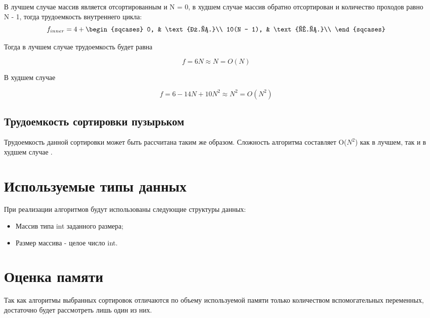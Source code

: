В лучшем случае массив является отсортированным и N = 0, в худшем случае массив обратно отсортирован и количество проходов равно N - 1, тогда трудоемкость внутреннего цикла:
\begin{equation}
	f_{inner} = 4 + \begin{sqcases}
						0, & \text{л.с.}\\
						10(N - 1), & \text{х.с.}\\
					\end{sqcases}
\end{equation}

Тогда в лучшем случае трудоемкость будет равна

\begin{equation}
	f = 6N \approx N = O(N)
\end{equation}

В худшем случае

\begin{equation}
	f = 6 - 14N + 10N^2 \approx N^2 = O(N^2)
\end{equation}

\subsection{Трудоемкость сортировки пузырьком}

Трудоемкость данной сортировки может быть рассчитана таким же образом. Сложность алгоритма составляет O($N^2$) как в лучшем, так и в худшем случае \cite{bubbleSort}.

\newpage
\section{Используемые типы данных}

При реализации алгоритмов будут использованы следующие структуры данных:
\begin{itemize}
	\item Массив типа int заданного размера;
	\item Размер массива - целое число int.
\end{itemize}

\section{Оценка памяти}

Так как алгоритмы выбранных сортировок отличаются по объему используемой памяти только количеством вспомогательных переменных, достаточно будет рассмотреть лишь один из них.

